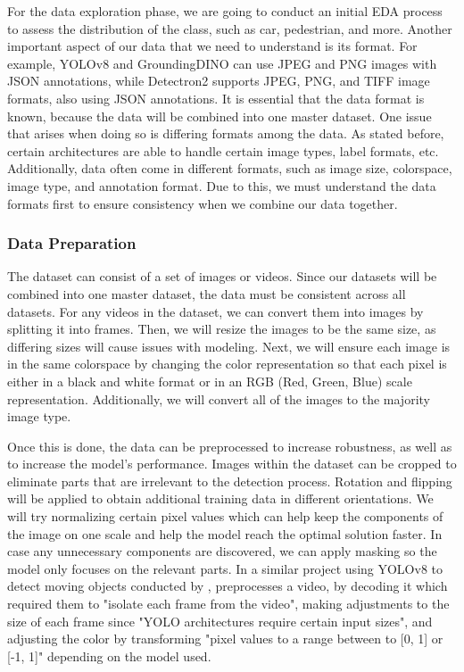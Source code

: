\documentclass[stu,12pt,floatsintext]{apa7}
\begin{document}
For the data exploration phase, we are going to conduct an initial EDA process to assess the distribution of the class, such as car, pedestrian, and more. Another important aspect of our data that we need to understand is its format. For example, YOLOv8 and GroundingDINO can use JPEG and PNG images with JSON annotations, while Detectron2 supports JPEG, PNG, and TIFF image formats, also using JSON annotations. It is essential that the data format is known, because the data will be combined into one master dataset. One issue that arises when doing so is differing formats among the data. As stated before, certain architectures are able to handle certain image types, label formats, etc. Additionally, data often come in different formats, such as image size, colorspace, image type, and annotation format. Due to this, we must understand the data formats first to ensure consistency when we combine our data together.


\subsubsection{Data Preparation}
The dataset can consist of a set of images or videos. Since our datasets will be combined into one master dataset, the data must be consistent across all datasets. For any videos in the dataset, we can convert them into images by splitting it into frames. Then, we will resize the images to be the same size, as differing sizes will cause issues with modeling. Next, we will ensure each image is in the same colorspace by changing the color representation so that each pixel is either in a black and white format or in an RGB (Red, Green, Blue) scale representation. Additionally, we will convert all of the images to the majority image type.

Once this is done, the data can be preprocessed to increase robustness, as well as to increase the model's performance.
Images within the dataset can be cropped to eliminate parts that are irrelevant to the detection process. Rotation and flipping will be applied to obtain additional training data in different orientations. We will try normalizing certain pixel values which can help keep the components of the image on one scale and help the model reach the optimal solution faster. In case any unnecessary components are discovered, we can apply masking so the model only focuses on the relevant parts. In a similar project using YOLOv8 to detect moving objects conducted by \textcite{safaldin_improved_2024}, preprocesses a video, by decoding it which required them to "isolate each frame from the video", making adjustments to the size of each frame since "YOLO architectures require certain input sizes", and adjusting the color by transforming "pixel values to a range between to [0, 1] or [-1, 1]" depending on the model used.
\end{document}
